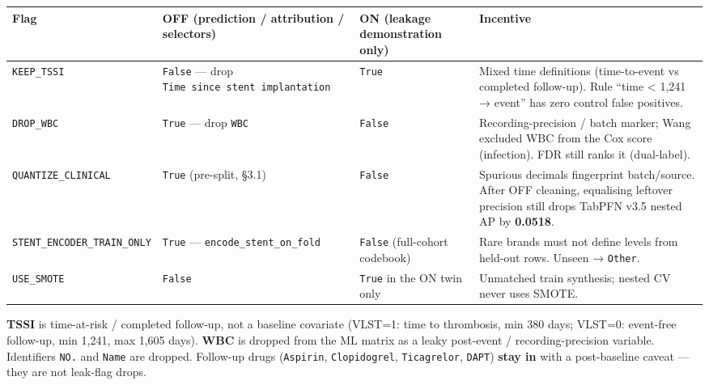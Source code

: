\documentclass[
]{article}
\newcounter{none} %
\begin{document}
{\def\LTcaptype{none} %
\begin{longtable}[]{@{}
  >{\raggedright\arraybackslash}p{}
  >{\raggedright\arraybackslash}p{}
  >{\raggedright\arraybackslash}p{}
  >{\raggedright\arraybackslash}p{}@{}}
\toprule\noalign{}
\begin{minipage}[b]{\linewidth}\raggedright
Flag
\end{minipage} & \begin{minipage}[b]{\linewidth}\raggedright
OFF (prediction / attribution / selectors)
\end{minipage} & \begin{minipage}[b]{\linewidth}\raggedright
ON (leakage demonstration only)
\end{minipage} & \begin{minipage}[b]{\linewidth}\raggedright
Incentive
\end{minipage} \\
\midrule\noalign{}
\endhead
\bottomrule\noalign{}
\endlastfoot
\texttt{KEEP\_TSSI} & \texttt{False} --- drop
\texttt{Time\ since\ stent\ implantation} & \texttt{True} & Mixed time
definitions (time-to-event vs completed follow-up). Rule ``time
\textless{} 1,241 → event'' has zero control false positives. \\
\texttt{DROP\_WBC} & \texttt{True} --- drop \texttt{WBC} &
\texttt{False} & Recording-precision / batch marker; Wang excluded WBC
from the Cox score (infection). FDR still ranks it (dual-label). \\
\texttt{QUANTIZE\_CLINICAL} & \texttt{True} (pre-split, §3.1) &
\texttt{False} & Spurious decimals fingerprint batch/source. After OFF
cleaning, equalising leftover precision still drops TabPFN v3.5 nested
AP by \textbf{0.0518}. \\
\texttt{STENT\_ENCODER\_TRAIN\_ONLY} & \texttt{True} ---
\texttt{encode\_stent\_on\_fold} & \texttt{False} (full-cohort codebook)
& Rare brands must not define levels from held-out rows. Unseen →
\texttt{Other}. \\
\texttt{USE\_SMOTE} & \texttt{False} & \texttt{True} in the ON twin only
& Unmatched train synthesis; nested CV never uses SMOTE. \\
\end{longtable}
}

\textbf{TSSI} is time-at-risk / completed follow-up, not a baseline
covariate (VLST=1: time to thrombosis, min 380 days; VLST=0: event-free
follow-up, min 1,241, max 1,605 days). \textbf{WBC} is dropped from the
ML matrix as a leaky post-event / recording-precision variable.
Identifiers \texttt{NO.} and \texttt{Name} are dropped. Follow-up drugs
(\texttt{Aspirin}, \texttt{Clopidogrel}, \texttt{Ticagrelor},
\texttt{DAPT}) \textbf{stay in} with a post-baseline caveat --- they are
not leak-flag drops.
\end{document}
